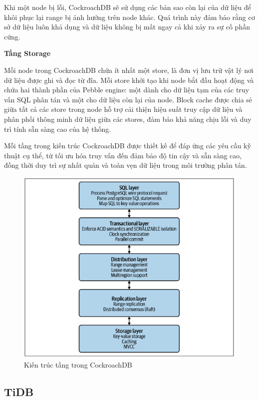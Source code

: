 \documentclass{article}[13pt]
\begin{document}
Khi một node bị lỗi, CockroachDB sẽ sử dụng các bản sao còn lại của dữ liệu để khôi phục lại range bị ảnh hưởng trên node khác. Quá trình này đảm bảo rằng cơ sở dữ liệu luôn khả dụng và dữ liệu không bị mất ngay cả khi xảy ra sự cố phần cứng.

\textbf{Tầng Storage}

Mỗi node trong CockroachDB chứa ít nhất một store, là đơn vị lưu trữ vật lý nơi dữ liệu được ghi và đọc từ đĩa. Mỗi store khởi tạo khi node bắt đầu hoạt động và chứa hai thành phần của Pebble engine: một dành cho dữ liệu tạm của các truy vấn SQL phân tán và một cho dữ liệu còn lại của node. Block cache được chia sẻ giữa tất cả các store trong node hỗ trợ cải thiện hiệu suất truy cập dữ liệu và phân phối thông minh dữ liệu giữa các stores, đảm bảo khả năng chịu lỗi và duy trì tính sẵn sàng cao của hệ thống.

Mỗi tầng trong kiến trúc CockroachDB được thiết kế để đáp ứng các yêu cầu kỹ thuật cụ thể, từ tối ưu hóa truy vấn đến đảm bảo độ tin cậy và sẵn sàng cao, đồng thời duy trì sự nhất quán và toàn vẹn dữ liệu trong môi trường phân tán.



\begin{figure}
    \centering
    \includegraphics[width=0.8\linewidth]{layercrdb.png}
    \caption{Kiến trúc tầng trong CockroachDB \cite{CockroachDBGuide}}
    \label{fig:layercrdb}
\end{figure}


\subsection{TiDB}
\end{document}
